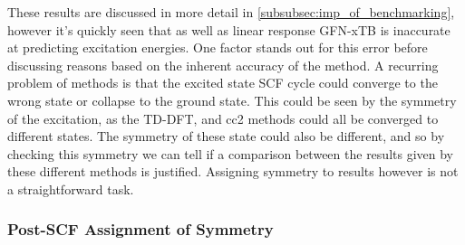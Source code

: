 These results are discussed in more detail in \ref{subsubsec:imp_of_benchmarking},
however it's quickly seen that \dxtb as well as linear response GFN-xTB is inaccurate 
at predicting excitation energies.
One factor stands out for this error before discussing reasons based on
the inherent accuracy of the method. A recurring problem of \dscf methods is that
the excited state SCF cycle could converge to the wrong state or collapse to the
ground state. This could be seen by the symmetry of the excitation, as the TD-DFT,
\dscf and cc2 methods could all be converged to different states. The symmetry of
these state could also be different, and so by checking this symmetry we can tell
if a comparison between the results given by these different methods is justified.
Assigning symmetry to \dscf results however is not a straightforward task.

\subsubsection{Post-SCF Assignment of Symmetry}
\label{subsubsec:post_scf_symmetry}

